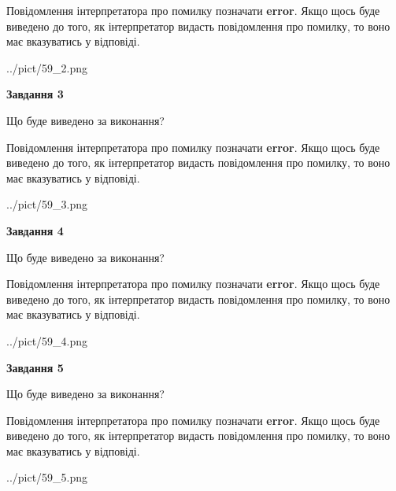 \documentclass[12pt, ukrainian]{article}
\begin{document}
{\begin {large}
Повідомлення інтерпретатора про помилку позначати \textbf{error}.
Якщо щось буде виведено до того, як інтерпретатор видасть повідомлення про помилку, 
то воно має вказуватись у відповіді. \par


\begin{center}
	{../pict/59_2.png}
\end{center}
\newpage

{\begin {center}\textbf{Завдання 3}\end {center}}\par
Що буде виведено за виконання?

Повідомлення інтерпретатора про помилку позначати \textbf{error}.
Якщо щось буде виведено до того, як інтерпретатор видасть повідомлення про помилку, 
то воно має вказуватись у відповіді. \par


\begin{center}
	{../pict/59_3.png}
\end{center}
\newpage

{\begin {center}\textbf{Завдання 4}\end {center}}\par
Що буде виведено за виконання?

Повідомлення інтерпретатора про помилку позначати \textbf{error}.
Якщо щось буде виведено до того, як інтерпретатор видасть повідомлення про помилку, 
то воно має вказуватись у відповіді. \par


\begin{center}
	{../pict/59_4.png}
\end{center}
\newpage

{\begin {center}\textbf{Завдання 5}\end {center}}\par
Що буде виведено за виконання?

Повідомлення інтерпретатора про помилку позначати \textbf{error}.
Якщо щось буде виведено до того, як інтерпретатор видасть повідомлення про помилку, 
то воно має вказуватись у відповіді. \par


\begin{center}
	{../pict/59_5.png}
\end{center}
\newpage


\end{large}}
\end{document}
